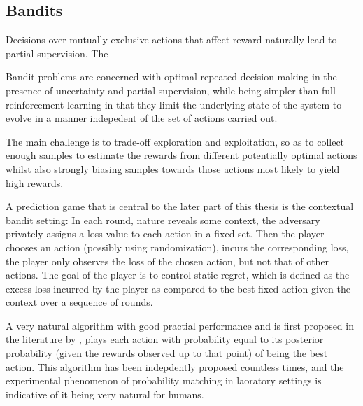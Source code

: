 
\subsection{Bandits}

Decisions over mutually exclusive actions that affect reward naturally lead to partial supervision.
The 

Bandit problems are concerned with optimal repeated decision-making in the presence of uncertainty and partial supervision, while being simpler than full reinforcement learning in that they limit the underlying state of the system to evolve in a manner indepedent of the set of actions carried out. 


The main challenge is to trade-off exploration and exploitation, so as to collect enough samples to estimate the rewards from different potentially optimal actions whilst also strongly biasing samples towards those actions most likely to yield high rewards.  

 A prediction game that is central to the later part of this thesis is the contextual bandit setting: In each round, nature reveals some context, the adversary privately assigns a loss value to each action in a fixed set.
 Then the player chooses an action (possibly using randomization), incurs the corresponding loss, the player only observes the loss of the chosen action, but not that of other actions.
 The goal of the player is to control static regret, which is defined as the excess loss incurred by the player as compared to the best fixed action given the context over a sequence of rounds.



 A very natural algorithm with good practial performance and is first proposed in the literature by \cite{thompson:33}, plays each action with probability equal to its posterior probability (given the rewards observed up to that point) of being the best action.
 This algorithm has been indepdently proposed countless times, and the experimental phenomenon of probability matching in laoratory settings is indicative of it being very natural for humans.



